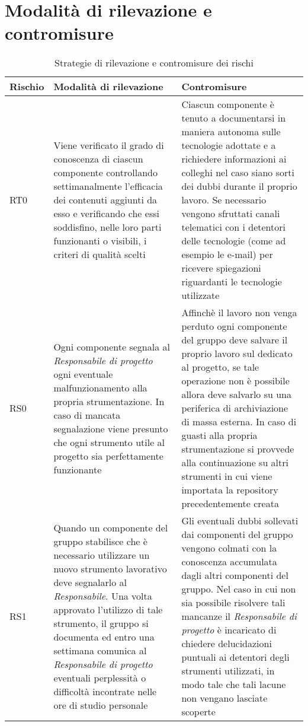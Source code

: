 \documentclass[../PianodiProgetto.tex]{subfiles}
\begin{document}
	\section {Modalità di rilevazione e contromisure}
	

		\begin{longtable}{|p{15mm}|p{60mm}|p{60mm}|}
			\caption{Strategie di rilevazione e contromisure dei rischi} \\
			\hline
			 \textbf{Rischio}& \textbf{Modalità di rilevazione}&\textbf{Contromisure}\\ \hline
			 RT0& Viene verificato il grado di conoscenza di ciascun componente controllando settimanalmente l'efficacia dei contenuti aggiunti da esso e verificando che essi soddisfino, nelle loro parti funzionanti o visibili, i criteri di qualità scelti & Ciascun componente è tenuto a documentarsi in maniera autonoma sulle tecnologie adottate e a richiedere informazioni ai colleghi nel caso siano sorti dei dubbi durante il proprio lavoro. Se necessario vengono sfruttati canali telematici con i detentori delle tecnologie (come ad esempio le e-mail) per ricevere spiegazioni riguardanti le tecnologie utilizzate\\ \hline
			 RS0& Ogni componente segnala al \textit{Responsabile di progetto} ogni eventuale malfunzionamento  alla propria strumentazione. In caso di mancata segnalazione viene presunto che ogni strumento utile al progetto sia perfettamente funzionante & Affinchè il lavoro non venga perduto ogni componente del gruppo deve salvare il proprio lavoro sul \glossario{repository}{Repository} \glossario{GitHub}{GitHub} dedicato al progetto, se tale operazione non è possibile allora deve salvarlo su una periferica di archiviazione di massa esterna. In caso di guasti alla propria strumentazione si provvede alla continuazione su altri strumenti in cui viene importata la repository precedentemente creata\\ \hline
			 \hline RS1& Quando un componente del gruppo stabilisce che è necessario utilizzare un nuovo strumento lavorativo deve segnalarlo al  \textit{Responsabile}. Una volta approvato l'utilizzo di tale strumento, il gruppo si documenta ed entro una settimana comunica al \textit{Responsabile di progetto} eventuali perplessità o difficoltà incontrate nelle ore di studio personale & Gli eventuali dubbi sollevati dai componenti del gruppo vengono colmati con la conoscenza accumulata dagli altri componenti del gruppo. Nel caso in cui non sia possibile risolvere tali mancanze il \textit{Responsabile di progetto} è incaricato di chiedere delucidazioni puntuali ai detentori degli strumenti utilizzati, in modo tale che tali lacune non vengano lasciate scoperte\\ \hline

\end{longtable}
\end{document}
